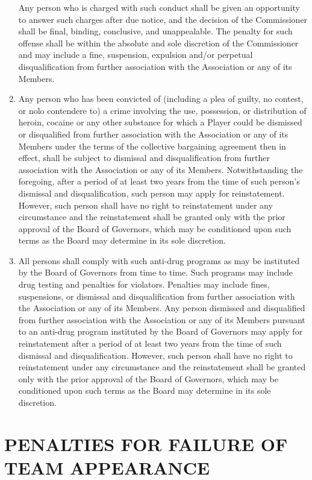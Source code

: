 \documentclass[]{book}
\theoremstyle{definition}
\theoremstyle{definition}
\theoremstyle{definition}
\theoremstyle{remark}
\begin{document}
\begin{enumerate}
  Any person who is charged with such conduct shall be given an
  opportunity to answer such charges after due notice, and the decision
  of the Commissioner shall be final, binding, conclusive, and
  unappealable. The penalty for such offense shall be within the
  absolute and sole discretion of the Commissioner and may include a
  fine, suspension, expulsion and/or perpetual disqualification from
  further association with the Association or any of its Members.
\item
  Any person who has been convicted of (including a plea of guilty, no
  contest, or nolo contendere to) a crime involving the use, possession,
  or distribution of heroin, cocaine or any other substance for which a
  Player could be dismissed or disqualified from further association
  with the Association or any of its Members under the terms of the
  collective bargaining agreement then in effect, shall be subject to
  dismissal and disqualification from further association with the
  Association or any of its Members. Notwithstanding the foregoing,
  after a period of at least two years from the time of such person's
  dismissal and disqualification, such person may apply for
  reinstatement. However, such person shall have no right to
  reinstatement under any circumstance and the reinstatement shall be
  granted only with the prior approval of the Board of Governors, which
  may be conditioned upon such terms as the Board may determine in its
  sole discretion.
\item
  All persons shall comply with such anti-drug programs as may be
  instituted by the Board of Governors from time to time. Such programs
  may include drug testing and penalties for violators. Penalties may
  include fines, suspensions, or dismissal and disqualification from
  further association with the Association or any of its Members. Any
  person dismissed and disqualified from further association with the
  Association or any of its Members pursuant to an anti-drug program
  instituted by the Board of Governors may apply for reinstatement after
  a period of at least two years from the time of such dismissal and
  disqualification. However, such person shall have no right to
  reinstatement under any circumstance and the reinstatement shall be
  granted only with the prior approval of the Board of Governors, which
  may be conditioned upon such terms as the Board may determine in its
  sole discretion.
\end{enumerate}

\section{PENALTIES FOR FAILURE OF TEAM
APPEARANCE}\label{penalties-for-failure-of-team-appearance}
\end{document}
